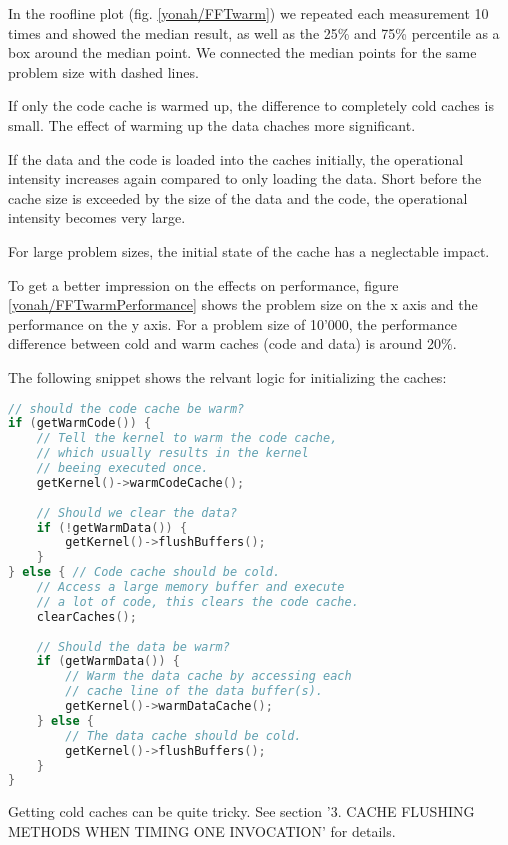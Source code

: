\documentclass[a4paper,12pt]{article}
\begin{document}
In the roofline plot (fig. \ref{yonah/FFTwarm}) we repeated each measurement
10 times and showed the median result, as well as the 25\% and 75\% percentile
as a box around the median point. We connected the median points for the same
problem size with dashed lines.

If only the code cache is warmed up, the difference to completely cold caches
is small. The effect of warming up the data chaches more significant. 

If the data and the code is loaded into the caches initially, the operational
intensity increases again compared to only loading the data.  Short before the
cache size is exceeded by the size of the data and the code, the operational
intensity becomes very large.

For large problem sizes, the initial state of the cache has a neglectable
impact.

To get a better impression on the effects on performance, figure 
\ref{yonah/FFTwarmPerformance} shows the problem size on the x axis and the
performance on the y axis. For a problem size of 10'000, the performance
difference between cold and warm caches (code and data) is around 20\%.


The following snippet shows the relvant logic for initializing the caches:

\begin{minipage}{\textwidth-18pt}
\begin{lstlisting}[language=C++]
// should the code cache be warm?
if (getWarmCode()) {
	// Tell the kernel to warm the code cache,  
	// which usually results in the kernel 
	// beeing executed once.
	getKernel()->warmCodeCache(); 
	
	// Should we clear the data?
	if (!getWarmData()) {
		getKernel()->flushBuffers();
	}
} else { // Code cache should be cold.
	// Access a large memory buffer and execute  
	// a lot of code, this clears the code cache.
	clearCaches();
	
	// Should the data be warm?
	if (getWarmData()) {
		// Warm the data cache by accessing each 
		// cache line of the data buffer(s).
		getKernel()->warmDataCache();
	} else {
		// The data cache should be cold. 
		getKernel()->flushBuffers();
	}
} 
\end{lstlisting}
\end{minipage}

Getting cold caches can be quite tricky. See
\cite{Whaley:2008:AAC:1462062.1462065} section '3.
CACHE FLUSHING METHODS WHEN TIMING ONE INVOCATION' for details.
\end{document}
